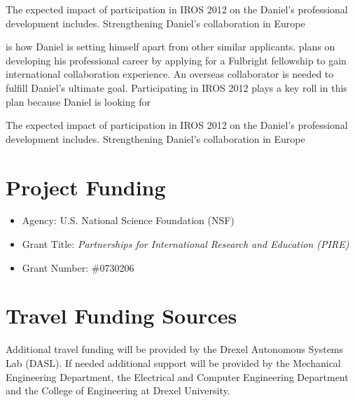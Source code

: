 \documentclass[11pt,a4paper,oneside]{report}
\begin{document}
The expected impact of participation in IROS 2012 on the Daniel's professional development includes. Strengthening Daniel's collaboration in Europe 


 is how Daniel is setting himself apart from other similar applicants.  plans on developing his professional career by applying for a Fulbright fellowship to gain international collaboration experience.
An overseas collaborator is needed to fulfill Daniel's ultimate goal.
Participating in IROS 2012 plays a key roll in this plan because Daniel is looking for 


The expected impact of participation in IROS 2012 on the Daniel's professional
development includes. Strengthening Daniel's collaboration in Europe 




\section*{Project Funding}
\begin{itemize}
\item Agency: U.S. National Science Foundation (NSF)
\item Grant Title: \textit{Partnerships for International Research
and Education (PIRE)}
\item Grant Number: \#0730206
\end{itemize}

\section*{Travel Funding Sources}
Additional travel funding will be provided by the Drexel Autonomous Systems Lab (DASL).  If needed additional support will be provided by the Mechanical Engineering Department, the Electrical and Computer Engineering Department and the College of Engineering at Drexel University.
\end{document}
